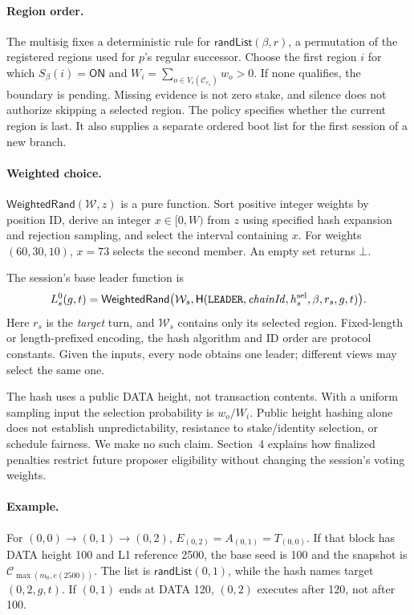 \documentclass[11pt,a4paper]{article}
\newcommand{\Hash}{\mathsf H}
\newcommand{\tagg}[1]{\mathsf{#1}}
\newcommand{\cfg}{\mathcal C}
\begin{document}
\paragraph{Region order.}
The multisig fixes a deterministic rule for
$\tagg{randList}(\beta,r)$, a permutation of the registered regions used
for $p$'s regular successor. Choose the first region $i$ for which
$S_\beta(i)=\tagg{ON}$ and $W_i=\sum_{o\in V_i(\cfg_{e_s})}w_o>0$.
If none qualifies, the boundary is pending. Missing evidence is not zero
stake, and silence does not authorize skipping a selected region. The
policy specifies whether the current region is last. It also supplies a
separate ordered boot list for the first session of a new branch.

\paragraph{Weighted choice.}
$\tagg{WeightedRand}(\mathcal W,z)$ is a pure function. Sort positive
integer weights by position ID, derive an integer $x\in[0,W)$ from $z$
using specified hash expansion and rejection sampling, and select the
interval containing $x$. For weights $(60,30,10)$, $x=73$ selects the
second member. An empty set returns $\bot$.

The session's base leader function is
\begin{equation}\label{eq:leader}
 L_s^0(g,t)=\tagg{WeightedRand}\bigl(\mathcal W_s,
 \Hash(\texttt{LEADER},\mathit{chainId},h_s^{\rm sel},\beta,r_s,g,t)\bigr).
\end{equation}
Here $r_s$ is the \emph{target} turn, and $\mathcal W_s$ contains only its
selected region. Fixed-length or length-prefixed encoding, the hash
algorithm and ID order are protocol constants. Given the inputs,
every node obtains one leader; different views may select the same one.

The hash uses a public DATA height, not transaction contents. With a
uniform sampling input the selection probability is $w_o/W_i$. Public
height hashing alone does not establish unpredictability, resistance to
stake/identity selection, or schedule fairness. We make no such claim.
Section~4 explains how finalized penalties restrict future proposer
eligibility without changing the session's voting weights.

\paragraph{Example.}
For $(0,0)\to(0,1)\to(0,2)$, $E_{(0,2)}=A_{(0,1)}=T_{(0,0)}$.
If that block has DATA height 100 and L1 reference 2500, the base seed is
100 and the snapshot is $\cfg_{\max(m_0,e(2500))}$. The list is
$\tagg{randList}(0,1)$, while the hash names target $(0,2,g,t)$.
If $(0,1)$ ends at DATA 120, $(0,2)$ executes after 120, not after 100.
\end{document}
